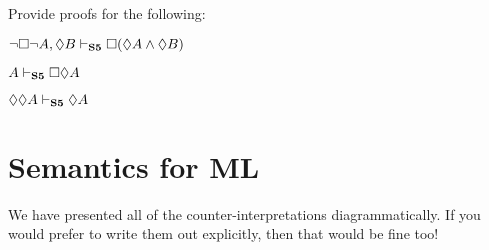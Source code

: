\problempart
Provide proofs for the following:
\begin{compactlist}
\item $\neg\Box\neg A, \Diamond B\vdash_{\mathbf{S5}}\Box(\Diamond A \wedge \Diamond B)$

\item $A\vdash_{\mathbf{S5}}\Box\Diamond A$

\item $\Diamond\Diamond A\vdash_{\mathbf{S5}}\Diamond A$
\end{compactlist}

\chapter{Semantics for ML}

We have presented all of the counter-interpretations diagrammatically. If you would prefer to write them out explicitly, then that would be fine too!

\setcounter{ProbPart}{0}

